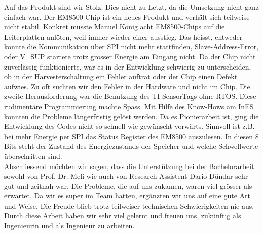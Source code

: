 Auf das Produkt sind wir Stolz. Dies nicht zu Letzt, da die Umsetzung nicht ganz einfach war. Der EM8500-Chip ist ein neues Produkt und verhält sich teilweise nicht stabil. Konkret musste Manuel König acht EM8500-Chips auf die Leiterplatten anlöten, weil immer wieder einer ausstieg. Das heisst, entweder konnte die Kommunikation über SPI nicht mehr stattfinden, Slave-Address-Error, oder V\_SUP startete trotz grosser Energie am Eingang nicht. Da der Chip nicht zuverlässig funktionierte, war es in der Entwicklung schwierig zu unterscheiden, ob in der Harvesterschaltung ein Fehler auftrat oder der Chip einen Defekt aufwies. Zu oft suchten wir den Fehler in der Hardware und nicht im Chip. Die zweite Herausforderung war die Benutzung des TI-SensorTags ohne RTOS. Diese rudimentäre Programmierung machte Spass. Mit Hilfe des Know-Hows am InES konnten die Probleme längerfristig gelöst werden. Da es Pionierarbeit ist, ging die Entwicklung des Codes nicht so schnell wie gewünscht vorwärts. Sinnvoll ist z.B. bei mehr Energie per SPI das Status Register des EM8500 auszulesen. In diesen 8 Bits steht der Zustand des Energiezustands der Speicher und welche Schwellwerte überschritten sind.\\

Abschliessend möchten wir sagen, dass die Unterstützung bei der Bachelorarbeit sowohl von Prof. Dr. Meli wie auch von Research-Assistent Dario Dündar sehr gut und zeitnah war. Die Probleme, die auf uns zukamen, waren viel grösser als erwartet. Da wir es super im Team hatten, ergänzten wir uns auf eine gute Art und Weise. Die Freude blieb trotz teilweiser technischen Schwierigkeiten nie aus. Durch diese Arbeit haben wir sehr viel gelernt und freuen uns, zukünftig als Ingenieurin und als Ingenieur zu arbeiten.



